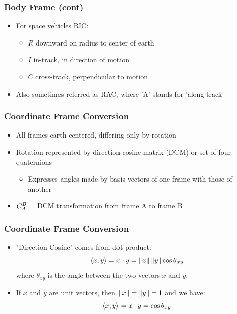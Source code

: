 \begin{frame}
\frametitle{Body Frame (cont)}
 \begin{itemize}
 \item For space vehicles RIC:
   \begin{itemize}
    \item $R$ downward on radius to center of earth
    \item $I$ in-track, in direction of motion
    \item $C$ cross-track, perpendicular to motion
   \end{itemize}
 \item Also sometimes referred as RAC, where 'A' stands for 'along-track'
\end{itemize}
\end{frame}

\begin{frame}
\frametitle{Coordinate Frame Conversion}
 \begin{itemize}
 \item All frames earth-centered, differing only by
 rotation
 \item Rotation represented by direction cosine matrix (DCM) or set of four quaternions
 \begin{itemize}
	\item Expresses angles made by basis vectors of one frame with those of another
 \end{itemize}
 \item $C_{A}^{B}$ = DCM transformation from frame A to frame B
\end{itemize}
\end{frame}

\begin{frame}
\frametitle{Coordinate Frame Conversion}
\begin{itemize}
  \item "Direction Cosine" comes from dot product:
\[\left<x,y\right>=x\cdot y=\left\Vert x\right\Vert\left\Vert y\right\Vert\cos\theta_{xy}\]
where $\theta_{xy}$ is the angle between the two vectors $x$ and $y$.
  \item If $x$ and $y$ are unit vectors, then $\left\Vert x\right\Vert=\left\Vert y\right\Vert=1$ and we have:
\[\left<x,y\right>=x\cdot y=\cos\theta_{xy}\]
\end{itemize} 
\end{frame}

